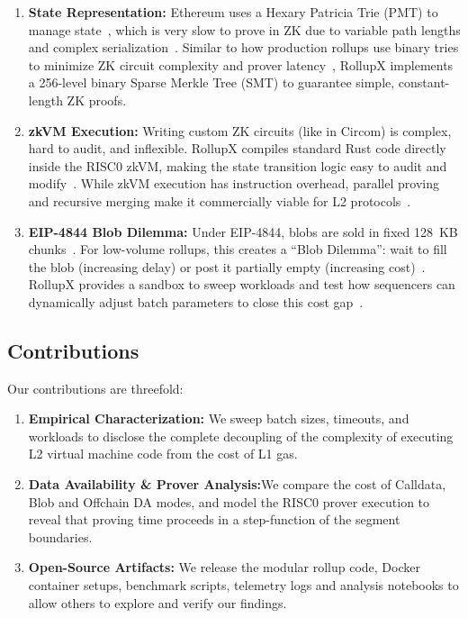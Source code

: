 \begin{enumerate}

\item \textbf{State Representation:} Ethereum uses a Hexary Patricia Trie (PMT) to manage state~\cite{wood2014ethereum}, which is very slow to prove in ZK due to variable path lengths and complex serialization~\cite{trilemma}. Similar to how production rollups use binary tries to minimize ZK circuit complexity and prover latency~\cite{zksync_era_docs, starknet_docs}, RollupX implements a 256-level binary Sparse Merkle Tree (SMT) to guarantee simple, constant-length ZK proofs.

\item \textbf{zkVM Execution:} Writing custom ZK circuits (like in Circom) is complex, hard to audit, and inflexible. RollupX compiles standard Rust code directly inside the RISC0 zkVM, making the state transition logic easy to audit and modify~\cite{lavaur2023modular}. While zkVM execution has instruction overhead, parallel proving and recursive merging make it commercially viable for L2 protocols~\cite{werner2024analyzing}.

\item \textbf{EIP-4844 Blob Dilemma:} Under EIP-4844, blobs are sold in fixed 128~KB chunks~\cite{eip4844}. For low-volume rollups, this creates a ``Blob Dilemma'': wait to fill the blob (increasing delay) or post it partially empty (increasing cost)~\cite{werner2024analyzing}. RollupX provides a sandbox to sweep workloads and test how sequencers can dynamically adjust batch parameters to close this cost gap~\cite{adler2021data, l2beat_dencun, dune_eip4844}.

\end{enumerate}

\subsection{Contributions}
Our contributions are threefold:
\begin{enumerate}
    \item \textbf{Empirical Characterization:} We sweep batch sizes, timeouts, and workloads to disclose the complete decoupling of the complexity of executing L2 virtual machine code from the cost of L1 gas.
    \item \textbf{Data Availability \& Prover Analysis:}We compare the cost of Calldata, Blob and Offchain DA modes, and model the RISC0 prover execution to reveal that proving time proceeds in a step-function of the segment boundaries.
    \item \textbf{Open-Source Artifacts:} We release the modular rollup code, Docker container setups, benchmark scripts, telemetry logs and analysis notebooks to allow others to explore and verify our findings.
\end{enumerate}